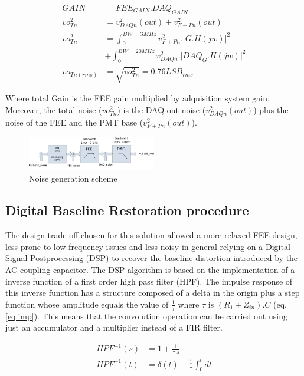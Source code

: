 \documentclass[a4paper, 10pt, oneside, twocolumn, 3p]{elsarticle}
\begin{document}
\begin{align}  
GAIN &= FEE_{GAIN}.DAQ_{GAIN} \\ 
vo_{Tn}^{2} &= v_{DAQn}^{2}(out) + v_{F+Pn}^{2}(out) \\
vo_{Tn}^{2} &= \int_{0}^{BW=3MHz}{v_{F+Pn}^{2}.{\lvert}G.H(jw){\rvert}^2}  \\
& + \int_{0}^{BW=20MHz}{v_{DAQn}^{2}.{\lvert}DAQ_{G}.H(jw){\rvert}^2}\\  
vo_{Tn(rms)} &= \sqrt{vo_{Tn}^{2}} = 0.76LSB_{rms}
\end{align}


Where total Gain is the FEE gain multiplied by adquisition system gain. Moreover, the total noise ($vo_{Tn}^{2}$) is the DAQ out noise ($v_{DAQn}^{2}(out)$) plus the noise of the FEE and the PMT base ($v_{F+Pn}^{2}(out)$).

\begin{figure}
	\begin{center}
		\includegraphics[width=0.5\textwidth]{./figures/NOISE.png}
		\caption{Noise generation scheme}
		\label{fig:noise_eq}
	\end{center}
\end{figure}


\subsection{Digital Baseline Restoration procedure}
\label{Digi_base_res}

\par The design trade-off chosen for this solution allowed a more relaxed FEE design, less prone to low frequency issues and less noisy in general relying on a Digital Signal Postprocessing (DSP) to recover the baseline distortion introduced by the AC coupling capacitor. The DSP algorithm is based on the implementation of a inverse function of a first order high pass filter (HPF). The impulse response of this inverse function has a structure composed of a delta in the origin plus a step function whose amplitude equals the value of $\frac{1}{\tau}$ where $\tau$ is $(R_1+Z_{in}).C$ (eq. \ref{eq:imp}). This means that the convolution operation can be carried out using just an accumulator and a multiplier instead of a FIR filter.

\begin{align}
HPF^{-1}(s)&=1+\frac{1}{\tau.s} \\
HPF^{-1}(t)&=\delta(t)+\frac{1}{\tau} \int_{0}^{t} dt
\label{eq:imp}
\end{align}
   
\end{document}
